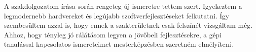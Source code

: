 A szakdolgozatom írása során rengeteg új ismeretre tettem szert. Igyekeztem a legmodernebb hardvereket és legújabb szoftverfejlesztéseket felkutatni. Így szembesültem azzal is, hogy ennek a szakterületnek csak felszínét vizsgáltam még. Ahhoz, hogy tényleg jó rálátásom legyen a jövőbeli fejlesztésekre, a gépi tanulással kapcsolatos ismereteimet mesterképzésben szeretném elmélyíteni.

